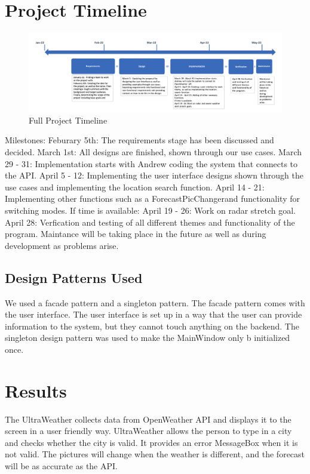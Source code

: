 \documentclass[10pt,conference,onecolumn,compsoc]{IEEEtran}
\begin{document}
\section{Project Timeline}
\begin{figure}[ht !]
\includegraphics[scale = 0.3]{Timeline.png}
\caption{Full Project Timeline}
\label{TimeLine}
\end{figure}
Milestones:
Feburary 5th: The requirements stage has been discussed and decided.
March 1st: All designs are finished, shown through our use cases.
March 29 - 31: Implementation starts with Andrew coding the system that connects to the API.
April 5 - 12: Implementing the user interface designs shown through the use cases and implementing the location search function.
April 14 - 21: Implementing other functions such as a ForecastPicChangerand functionality for switching modes.
If time is available:
April 19 - 26: Work on radar stretch goal.
April 28: Verfication and testing of all different themes and functionality of the program.
Maintance will be taking place in the future as well as during development as problems arise.



\subsection{Design Patterns Used}
We used a facade pattern and a singleton pattern. The facade pattern comes with the user interface. The user interface is set up in a way that the user can provide information to the system, but they cannot touch anything on the backend. The singleton design pattern was used to make the MainWindow only b initialized once.

\section{Results}
The UltraWeather collects data from OpenWeather API and displays it to the screen in a user friendly way. UltraWeather allows the person to type in a city and checks whether the city is valid. It provides an error MessageBox when it is not valid. The pictures will change when the weather is different, and the forecast will be as accurate as the API.
\end{document}
